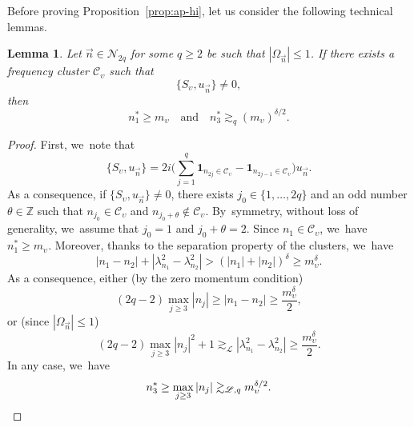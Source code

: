 \documentclass[JEP,XML,SOM,Unicode,published]{cedram}
\theoremstyle{plain}
\newtheorem{lemma}[theorem]{Lemma}
\theoremstyle{definition}
\newcommand{\1}{\mathbf{1}}
\begin{document}
Before proving Proposition~\ref{prop:ap-hi}, let us consider the following technical lemmas.

\begin{lemma}\label{lem:mu3} Let $\vec{n}\in\mathcal{N}_{2q}$ for some $q\geq2$ be such that $|\Omega_{\vec{n}}|\leq 1$. If there exists a frequency cluster $\mathscr{C}_{\upsilon}$ such that
\[
\{ S_{\upsilon}, u_{\vec{n}}\} \neq 0,
\]
then
\[
n_{1}^{\ast}\geq m_\upsilon \quad \mathrm{and} \quad n_{3}^{\ast}\gtrsim_q (m_\upsilon)^{\delta/2}.
\]
\end{lemma}

\begin{proof}
First, we~note that
\[
\{ S_{\upsilon}, u_{\vec{n}}\} = 2i \biggl(\sum_{j=1}^q \mathbf{1}_{n_{2j} \in \mathscr{C}_\upsilon } - \mathbf{1}_{n_{2j-1} \in \mathscr{C}_\upsilon } \biggr) u_{\vec{n}}.
\]
As a consequence, if $\{ S_{\upsilon}, u_{\vec{n}}\} \neq 0$, there exists $j_0 \in \{1,\dots,2q\}$ and an odd number $\theta\in \mathbb{Z}$ such that $n_{j_0} \in \mathscr{C}_\upsilon$ and $n_{j_0 + \theta} \notin \mathscr{C}_\upsilon$. By~symmetry, without loss of generality, we~assume that $j_0=1$ and $j_0 + \theta= 2$. Since $n_1 \in \mathscr{C}_\upsilon$, we~have $n_{1}^{\ast}\geq m_\upsilon$. Moreover, thanks to the separation property of the clusters, we~have
\[
|n_1-n_2| + |\lambda_{n_{1}}^{2}-\lambda_{n_{2}}^{2}| > (|n_1|+|n_2|)^{\delta} \geq m_\upsilon^{\delta}.
\]
As a consequence, either (by the zero momentum condition)
\[
(2q-2) \max_{j\geq 3} |n_j| \geq |n_1-n_2| \geq \frac{m_\upsilon^{\delta}}2,
\]
or (since $|\Omega_{\vec{n}}|\leq 1$)
\[
(2q-2) \max_{j\geq 3} |n_j|^2 + 1 \gtrsim_{\mathscr{L}} |\lambda_{n_{1}}^{2}-\lambda_{n_{2}}^{2}| \geq \frac{m_\upsilon^{\delta}}2.
\]
In any case, we~have
\[
n_3^* \geq \max_{j\geq 3} | n_j | \gtrsim_{\mathscr{L},q} m_\upsilon^{\delta/2}.\qedhere
\]
\end{proof}
\end{document}
